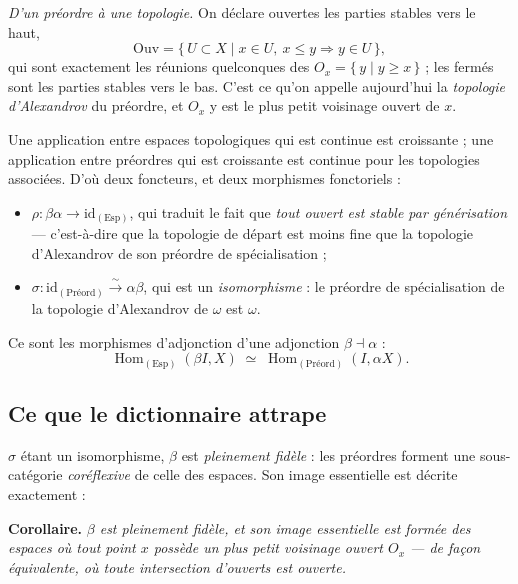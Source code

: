 \documentclass[11pt,a4paper]{article}
\begin{document}
\emph{D'un préordre à une topologie.} On déclare ouvertes les parties stables
vers le haut,
\[
\mathrm{Ouv} = \{\, U \subset X \mid x \in U,\ x \leq y \Rightarrow y \in U \,\},
\]
qui sont exactement les réunions quelconques des
$O_{x} = \{\, y \mid y \geq x \,\}$ ; les fermés sont les parties stables vers
le bas. C'est ce qu'on appelle aujourd'hui la \emph{topologie d'Alexandrov} du
préordre, et $O_{x}$ y est le plus petit voisinage ouvert de $x$.

Une application entre espaces topologiques qui est continue est croissante ;
une application entre préordres qui est croissante est continue pour les
topologies associées. D'où deux foncteurs, et deux morphismes fonctoriels :

\begin{itemize}
\item $\rho : \beta\alpha \to \mathrm{id}_{(\mathrm{Esp})}$, qui traduit le fait
que \emph{tout ouvert est stable par générisation} — c'est-à-dire que la
topologie de départ est moins fine que la topologie d'Alexandrov de son
préordre de spécialisation ;
\item $\sigma : \mathrm{id}_{(\text{Préord})} \xrightarrow{\ \sim\ } \alpha\beta$,
qui est un \emph{isomorphisme} : le préordre de spécialisation de la topologie
d'Alexandrov de $\omega$ est $\omega$.
\end{itemize}

Ce sont les morphismes d'adjonction d'une adjonction $\beta \dashv \alpha$ :
\[
\operatorname{Hom}_{(\mathrm{Esp})}(\beta I, X) \;\simeq\;
\operatorname{Hom}_{(\text{Préord})}(I, \alpha X).
\]

\subsection*{Ce que le dictionnaire attrape}

$\sigma$ étant un isomorphisme, $\beta$ est \emph{pleinement fidèle} : les
préordres forment une sous-catégorie \emph{coréflexive} de celle des espaces.
Son image essentielle est décrite exactement :

\textbf{Corollaire.} \emph{$\beta$ est pleinement fidèle, et son image
essentielle est formée des espaces où tout point $x$ possède un plus petit
voisinage ouvert $O_{x}$ — de façon équivalente, où toute intersection
d'ouverts est ouverte.}
\end{document}
